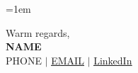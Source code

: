 \documentclass[letterpaper,11pt]{article}
\newenvironment{lettercontent}{
  \normalsize
  \parskip=1em
  \parindent=0pt
}{}
\begin{document}

\begin{lettercontent}
\end{lettercontent}

\vspace{20pt}
Warm regards, \\ \vspace{10pt}
\textbf{{{NAME}}} \\
\small {{PHONE}} $|$ \href{mailto:{{EMAIL}}}{\underline{{{EMAIL}}}} $|$ \href{{{LINKEDIN}}}{\underline{LinkedIn}}
\end{document}
